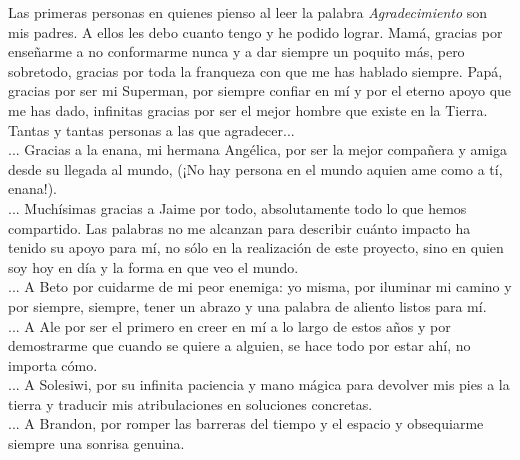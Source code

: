 \documentclass[
11pt, %
spanish, %
singlespacing, %
headsepline, %
]{MastersDoctoralThesis} %
\begin{document}

\begin{acknowledgements}
\addchaptertocentry{\acknowledgementname} %

Las primeras personas en quienes pienso al leer la palabra \textit{Agradecimiento} son mis padres. A ellos les debo cuanto tengo y he podido lograr. Mamá, gracias por enseñarme a no conformarme nunca y a dar siempre un poquito más, pero sobretodo, gracias por toda la franqueza con que me has hablado siempre. Papá, gracias por ser mi Superman, por siempre confiar en mí y por el eterno apoyo que me has dado, infinitas gracias por ser el mejor hombre que existe en la Tierra.\\

Tantas y tantas personas a las que agradecer...\\

... Gracias a la enana, mi hermana Angélica, por ser la mejor compañera y amiga desde su llegada al mundo, (¡No hay persona en el mundo aquien ame como a tí, enana!). \\

... Muchísimas gracias a Jaime por todo, absolutamente todo lo que hemos compartido. Las palabras no me alcanzan para describir cuánto impacto ha tenido su apoyo para mí, no sólo en la realización de este proyecto, sino en quien soy hoy en día y la forma en que veo el mundo.\\

... A Beto por cuidarme de mi peor enemiga: yo misma, por iluminar mi camino y por siempre, siempre, tener un abrazo y una palabra de aliento listos para mí. \\

... A Ale por ser el primero en creer en mí a lo largo de estos años y por demostrarme que cuando se quiere a alguien, se hace todo por estar ahí, no importa cómo.\\

... A Solesiwi, por su infinita paciencia y mano mágica para devolver mis pies a la tierra y traducir mis atribulaciones en soluciones concretas.\\

... A Brandon, por romper las barreras del tiempo y el espacio y obsequiarme siempre una sonrisa genuina.\\


\end{acknowledgements}
\end{document}
